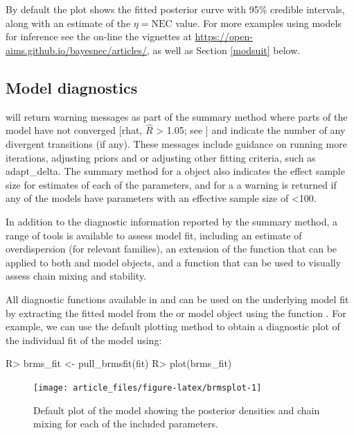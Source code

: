 \documentclass[
  shortnames]{jss}
\begin{document}
By default the plot shows the fitted posterior curve with 95\% credible intervals, along with an estimate of the \(\eta = \text{NEC}\) value. For more examples using  models for inference see the on-line the vignettes at \url{https://open-aims.github.io/bayesnec/articles/}, as well as Section \ref{modsuit} below.

\subsection[Model diagnostics]{Model diagnostics}\label{moddiag}

 will return warning messages as part of the summary method where parts of the model have not converged {[}rhat, \(\widehat{R}\) \textgreater{} 1.05; see \citet{vehtari2021rank}{]} and indicate the number of any divergent transitions (if any). These messages include guidance on running more iterations, adjusting priors and or adjusting other fitting criteria, such as adapt\_delta. The summary method for a  object also indicates the effect sample size for estimates of each of the parameters, and for a  a warning is returned if any of the models have parameters with an effective sample size of \textless100.

In addition to the diagnostic information reported by the summary method, a range of tools is available to assess model fit, including an estimate of overdispersion (for relevant families), an extension of the   function that can be applied to both  and  model objects, and a function  that can be used to visually assess chain mixing and stability.

All diagnostic functions available in  and  can be used on the underlying  model fit by extracting the fitted  model from the  or  model object using the function . For example, we can use the default  plotting method to obtain a diagnostic plot of the individual fit of the  model using:

\begin{CodeChunk}
\begin{CodeInput}
R> brms_fit <- pull_brmsfit(fit)
R> plot(brms_fit)
\end{CodeInput}
\begin{figure}[!ht]

{\centering \texttt{[image: article\_files/figure-latex/brmsplot-1]} 

}

\caption[Default  plot of the  model showing the posterior densities and chain mixing for each of the included parameters]{Default  plot of the  model showing the posterior densities and chain mixing for each of the included parameters.}\label{fig:brmsplot}
\end{figure}
\end{CodeChunk}
\end{document}
